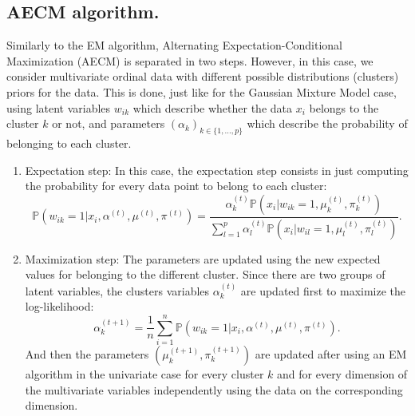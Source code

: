 \subsection{AECM algorithm.} 
\label{sec:aecm}

Similarly to the EM algorithm, Alternating Expectation-Conditional Maximization (AECM) \citep{meng1997algorithm} is separated in two steps. However, in this case, we consider multivariate ordinal data with different possible distributions (clusters) priors for the data. This is done, just like for the Gaussian Mixture Model case, using latent variables $w_{ik}$ which describe whether the data $x_i$ belongs to the cluster $k$ or not, and parameters $(\alpha_k)_{k\in \{1, \ldots, p\}}$ which describe the probability of belonging to each cluster. 
\begin{enumerate}
    \item Expectation step: In this case, the expectation step consists in just computing the probability for every data point to belong to each cluster:
    \begin{equation}
        \mathbb{P}(w_{ik}=1|x_i, \alpha^{(t)}, \mu^{(t)}, \pi^{(t)}) = \frac{\alpha_k^{(t)}\mathbb{P}(x_i|w_{ik}=1, \mu_k^{(t)}, \pi_k^{(t)})}{\sum_{l=1}^p\alpha_l^{(t)}\mathbb{P}(x_i|w_{il}=1, \mu_l^{(t)}, \pi_l^{(t)})}.
    \end{equation}
    \item Maximization step: The parameters are updated using the new expected values for belonging to the different cluster. Since there are two groups of latent variables, the clusters variables $\alpha_k^{(t)}$ are updated first to maximize the log-likelihood:
    \begin{equation}
    \alpha_k^{(t+1)} = \frac{1}{n} \sum_{i=1}^n \mathbb{P}(w_{ik}=1|x_i, \alpha^{(t)}, \mu^{(t)}, \pi^{(t)}).
    \end{equation}
    And then the parameters $(\mu_k^{(t+1)}, \pi_k^{(t+1)})$ are updated after using an EM algorithm in the univariate case for every cluster $k$ and for every dimension of the multivariate variables independently using the data on the corresponding dimension.
\end{enumerate}

